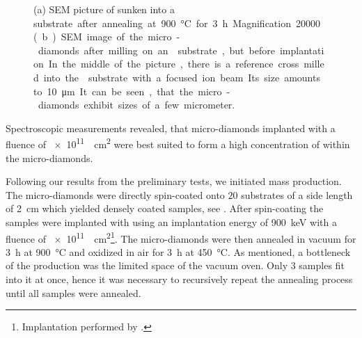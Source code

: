 		\begin{figure}[!htb]
			\begin{subfigure}[t]{ 0.49\linewidth}
				\centering
				\caption{}\label{subfig::sunken_nd}
			\end{subfigure}
			\hfill
			\begin{subfigure}[t]{ 0.49\linewidth}
				\centering
				\caption{}\label{subfig::microdiamonds}
			\end{subfigure}
			\caption[SEM images of micro and nanodiamonds]{(a) SEM picture of \nds sunken into a \si substrate after annealing at \SI{900}{\celsius} for \SI{3}{h}. Magnification \num{20000}. (b) SEM image of the micro-diamonds after milling on an \ir substrate, but before implantation. In the middle of the picture, there is a reference cross milled into the \ir substrate with a focused ion beam. Its size amounts to \SI{10}{\micro\meter}. It can be seen, that the micro-diamonds exhibit sizes of a few micrometer.}
		\end{figure}

		Spectroscopic measurements revealed, that micro-diamonds implanted with a fluence of \SI{e11}{\per\centi\meter\squared} were best suited to form a high concentration of \sivs within the micro-diamonds.
	
			Following our results from the preliminary tests, we initiated mass production.
		The micro-diamonds were directly spin-coated onto $20$ \ir substrates of a side length of \SI{2}{cm} which yielded densely coated samples, see .
		After spin-coating the samples were implanted with  using an implantation energy of \SI{900}{keV} with a fluence of \SI{e11}{\per\centi\meter\squared}\footnote{Implantation performed by \klug.}.
		The micro-diamonds were then annealed in vacuum for \SI{3}{\hour} at \SI{900}{\celsius} and oxidized in air for \SI{3}{\hour} at \SI{450}{\celsius}.
		As mentioned, a bottleneck of the production was the limited space of the vacuum oven.
		Only $3$ samples fit into it at once, hence it was necessary to recursively repeat the annealing process until all samples were annealed.
	
